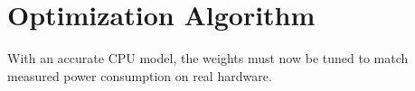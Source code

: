 \section{Optimization Algorithm}

With an accurate CPU model, the weights must now be tuned to match measured
power consumption on real hardware.

